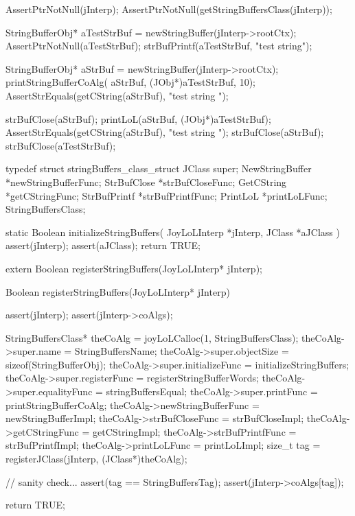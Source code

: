 \startCTest
  AssertPtrNotNull(jInterp);
  AssertPtrNotNull(getStringBuffersClass(jInterp));

  StringBufferObj* aTestStrBuf = newStringBuffer(jInterp->rootCtx);
  AssertPtrNotNull(aTestStrBuf);
  strBufPrintf(aTestStrBuf, "test string");
  
  StringBufferObj* aStrBuf = newStringBuffer(jInterp->rootCtx);
  printStringBufferCoAlg(
    aStrBuf, (JObj*)aTestStrBuf, 10);
  AssertStrEquals(getCString(aStrBuf), "test string ");
  
  strBufClose(aStrBuf);
  printLoL(aStrBuf, (JObj*)aTestStrBuf);
  AssertStrEquals(getCString(aStrBuf), "test string ");
  strBufClose(aStrBuf);
  strBufClose(aTestStrBuf);
\stopCTest
\stopTestCase
\stopTestSuite

\startTestSuite[registerStringBuffers]

\startCHeader
typedef struct stringBuffers_class_struct {
  JClass           super;
  NewStringBuffer *newStringBufferFunc;
  StrBufClose     *strBufCloseFunc;
  GetCString      *getCStringFunc;
  StrBufPrintf    *strBufPrintfFunc;
  PrintLoL        *printLoLFunc;
} StringBuffersClass;
\stopCHeader

\startCCode
static Boolean initializeStringBuffers(
  JoyLoLInterp *jInterp,
  JClass   *aJClass
) {
  assert(jInterp);
  assert(aJClass);
  return TRUE;
}
\stopCCode

\startCHeader
extern Boolean registerStringBuffers(JoyLoLInterp* jInterp);
\stopCHeader
{}

\startCCode
Boolean registerStringBuffers(JoyLoLInterp* jInterp) {
  assert(jInterp);
  assert(jInterp->coAlgs);
  
  StringBuffersClass* theCoAlg  =
    joyLoLCalloc(1, StringBuffersClass);
  theCoAlg->super.name            = StringBuffersName;
  theCoAlg->super.objectSize      = sizeof(StringBufferObj);
  theCoAlg->super.initializeFunc  = initializeStringBuffers;
  theCoAlg->super.registerFunc    = registerStringBufferWords;
  theCoAlg->super.equalityFunc    = stringBuffersEqual;
  theCoAlg->super.printFunc       = printStringBufferCoAlg;
  theCoAlg->newStringBufferFunc   = newStringBufferImpl;
  theCoAlg->strBufCloseFunc       = strBufCloseImpl;
  theCoAlg->getCStringFunc        = getCStringImpl;
  theCoAlg->strBufPrintfFunc      = strBufPrintfImpl;
  theCoAlg->printLoLFunc          = printLoLImpl;
  size_t tag =
    registerJClass(jInterp, (JClass*)theCoAlg);
  
  // sanity check...
  assert(tag == StringBuffersTag);
  assert(jInterp->coAlgs[tag]);

  return TRUE;
}
\stopCCode

